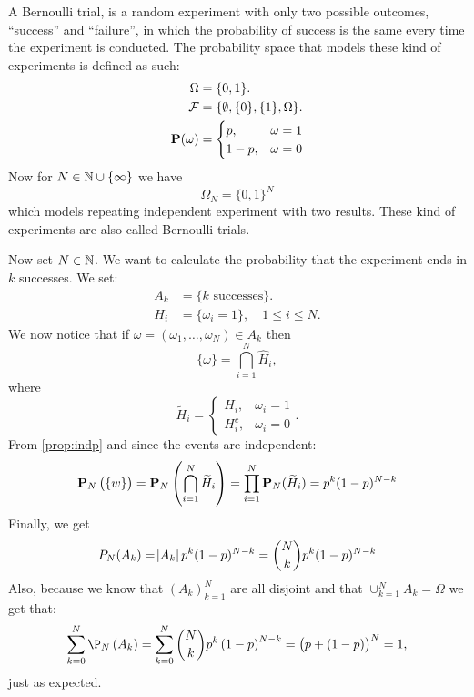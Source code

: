 \documentclass[11pt,a4paper]{article}
\begin{document}
  \begin{example}
    A Bernoulli trial, is a random experiment with only two possible outcomes,
    ``success'' and ``failure'', in which the probability of success is the 
    same every time the experiment is conducted. The probability space that
    models these kind of experiments is defined as such:
    \begin{align*}
      \Omega &= \{0, 1\}. \\
      \mathcal F &= \{\emptyset, \{0\}, \{1\}, \Omega\}. \\
      \mathbf{P}(\omega) &=
      \begin{cases}
        p, &\omega = 1 \\
        1-p, &\omega= 0
      \end{cases}
    \end{align*}
    Now for $N \in \mathbb{N} \cup \{\infty\}$ we have
    \[ \Omega_N = \{0, 1\}^N \]
    which models repeating independent experiment with two results.
    These kind of experiments are also called Bernoulli trials.

    Now set $N \in \mathbb{N}$. We want to calculate the probability that the
    experiment ends in $k$ successes. We set:
    \begin{align*}
      A_k &= \{\text{$k$ successes}\}. \\
      H_i &= \{\omega_i = 1\}, \quad 1 \le i \le N.
    \end{align*}
    We now notice that if $\omega = (\omega_1,\dots,\omega_N) \in A_k$ then
    \[
      \{\omega\} = \bigcap_{i=1}^{N} \widehat{H}_i,
    \]
    where
    \[
      \widetilde{H}_{i} = 
      \begin{cases}
        H_{i}, &\omega_{i} = 1 \\ 
        H_{i}^{c}, &\omega_{i} = 0
      \end{cases}.
    \]
    From \autoref{prop:indp} and since the events are independent:
    \[
      \mathbf{P}_N\left(\{w\}\right) =
      \mathbf{P}_N\left(\bigcap_{i=1}^{N} \widetilde{H}_i \right) = 
      \prod_{i=1}^{N} \mathbf{P}_N(\widetilde{H}_i) =
      p^k (1-p)^{N-k}
    \]
    Finally, we get
    \[
      P_N(A_k) = 
      \abs{A_k} p^k (1-p)^{N-k} = 
      \binom{N}{k} p^k (1-p)^{N-k}
    \]
    Also, because we know that $(A_k)_{k=1}^{N}$ are all disjoint and that
    $\cup_{k=1}^{N} A_k = \Omega$ we get that:
    \[
      \sum_{k=0}^{N}\P_{N}\left(A_{k}\right) = 
      \sum_{k=0}^{N}{\binom{N}{k}}p^{k}\left(1-p\right)^{N-k} = 
      \left(p+\left(1-p\right)\right)^{N} = 1,
    \]
    just as expected.
  \end{example}
\end{document}

